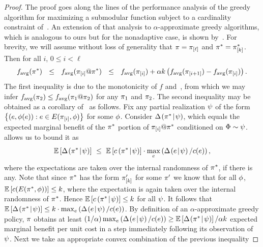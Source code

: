 \begin{proof}
%
%
The proof goes along the lines of the performance analysis of the
greedy algorithm for maximizing a submodular function subject to
a cardinality constraint of~\citet{nemhauser78}.  An
extension of that analysis to $\alpha$-approximate greedy algorithms, 
which is analogous to ours but for the nonadaptive case, is shown by~\citet{goundan07}.
%
For brevity, we will assume without loss of generality that
 $\pi =  \pi_{[{\ell}]} $ and $\pi^* =  \pi^*_{[{k}]} $.  
Then for all $i$, $0 \le i < \ell$
\begin{equation}
  \label{eqn:ee1}
  \avgf(\policy^*) \ \ \le \ \ \avgf(
  \append{\prune{\policy}{i}}{\policy^*}) \ \ \le \ \ \avgf(\prune{\policy}{i}) + \alpha k \paren{\avgf(\prune{\policy}{i+1}) - \avgf(\prune{\policy}{i})}. 
\end{equation}
%
%
%
%
%
%
%
%
The first inequality is due to the \term monotonicity of $f$ and~, from which we
  may infer $f_{\text{avg}}(\pi_2) \le f_{\text{avg}}({\pi_1}@{\pi_2})$ for any $\pi_1$ and $\pi_2$.
%
The second inequality may be obtained as 
%
%
a corollary of~ as follows.
Fix any partial realization ${\color{black}{\ensuremath{\psi}}}$ of the form 
$\left\{(e, {\color{black}{\ensuremath{\phi}}}(e)) : e \in E({ \pi_{[{i}]} }, {{\color{black}{\ensuremath{\phi}}}})\right\}$
for some ${\color{black}{\ensuremath{\phi}}}$.
%
%
Consider $\Delta \hspace{-0.3mm} \left( { {\pi^*}\! \mid \! {{\color{black}{\ensuremath{\psi}}}} } \right)  $, which equals 
the expected marginal benefit of the $\pi^*$ portion of
${ \pi_{[{i}]} }@{\pi^*}$ conditioned on ${\color{black}{\ensuremath{\Phi}}} \sim
{\color{black}{\ensuremath{\psi}}}$.  
%
%
%
%
%
 allows us to bound it as
$$\expct{\diff{\prlz}{\policy^*}} \ \le \ \expct{\condcost{\prlz}{\policy^*}} \cdot
\max_{e} \paren{\diff{\prlz}{e}/c(e)},$$ 
where the expectations are taken
over the internal randomness of $\pi^*$, if there is any.  Note
that since $\pi^*$ has the form $ \pi'_{[{k}]} $ for some
$\pi'$ we know that for all ${\color{black}{\ensuremath{\phi}}}$,
$\mathbb{E}\left[c(E({\pi^*}, {{\color{black}{\ensuremath{\phi}}}}))\right] \le k$, where the
expectation is again taken over the internal randomness of $\pi^*$.
Hence $\mathbb{E}\left[c \left( { {\pi^*} \! \mid \! {{\color{black}{\ensuremath{\psi}}}} } \right)  \right] \le k$ for all ${\color{black}{\ensuremath{\psi}}}$.  It
follows that $\mathbb{E}\left[\Delta \hspace{-0.3mm} \left( { {\pi^*}\! \mid \! {{\color{black}{\ensuremath{\psi}}}} } \right)  \right] \le k \cdot
\max_{e}  \left( {\Delta \hspace{-0.3mm} \left( { {e}\! \mid \! {{\color{black}{\ensuremath{\psi}}}} } \right)  /c(e)} \right) $.
%
By definition of an $\alpha$-approximate greedy policy, $\pi$
obtains at least $(1/\alpha)\max_{e}
 \left( {\Delta \hspace{-0.3mm} \left( { {e}\! \mid \! {{\color{black}{\ensuremath{\psi}}}} } \right)  /c(e)} \right)  \ge \mathbb{E}\left[\Delta \hspace{-0.3mm} \left( { {\pi^*}\! \mid \! {{\color{black}{\ensuremath{\psi}}}} } \right)  \right] / \alpha k$ 
expected marginal benefit per unit cost 
 in a step immediately following its observation of ${\color{black}{\ensuremath{\psi}}}$.
%
%
%
%
Next we take an appropriate convex combination of the previous inequality

\end{proof}
